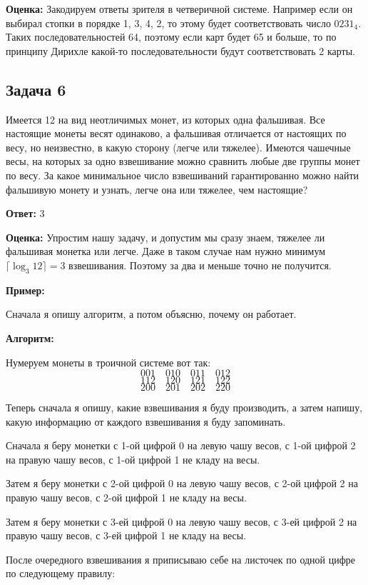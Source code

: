 \textbf{Оценка:} Закодируем ответы зрителя в четверичной системе. Например если он выбирал стопки в порядке 1, 3, 4, 2, то этому будет соответствовать число $0231_4$. Таких последовательностей 64, поэтому если карт будет 65 и больше, то по принципу Дирихле какой-то последовательности будут соответствовать 2 карты.

\subsection{Задача 6}

Имеется 12 на вид неотличимых монет, из которых одна фальшивая. Все настоящие
монеты весят одинаково, а фальшивая отличается от настоящих по весу, но неизвестно, в какую сторону (легче или тяжелее). Имеются чашечные весы, на которых за одно
взвешивание можно сравнить любые две группы монет по весу. За какое минимальное число взвешиваний гарантированно можно найти фальшивую монету и узнать,
легче она или тяжелее, чем настоящие?

\textbf{Ответ:} 3

\textbf{Оценка:} Упростим нашу задачу, и допустим мы сразу знаем, тяжелее ли фальшивая монетка или легче. Даже в таком случае нам нужно минимум $\lceil\log_3{12}\rceil = 3$ взвешивания. Поэтому за два и меньше точно не получится.

\textbf{Пример:}

Сначала я опишу алгоритм, а потом объясню, почему он работает.

\textbf{Алгоритм:}

Нумеруем монеты в троичной системе вот так:
\[
001 \quad 010 \quad 011 \quad 012
\]
\[
112 \quad 120 \quad 121 \quad 122
\]
\[
200 \quad 201 \quad 202 \quad 220
\] 

Теперь сначала я опишу, какие взвешивания я буду производить, а затем напишу, какую информацию от каждого взвешивания я буду запоминать.

Сначала я беру монетки с 1-ой цифрой 0 на левую чашу весов, с 1-ой цифрой 2 на правую чашу весов, с 1-ой цифрой 1 не кладу на весы.

Затем я беру монетки с 2-ой цифрой 0 на левую чашу весов, с 2-ой цифрой 2 на правую чашу весов, с 2-ой цифрой 1 не кладу на весы.

Затем я беру монетки с 3-ей цифрой 0 на левую чашу весов, с 3-ей цифрой 2 на правую чашу весов, с 3-ей цифрой 1 не кладу на весы.

После очередного взвешивания я приписываю себе на листочек по одной цифре по следующему правилу:

